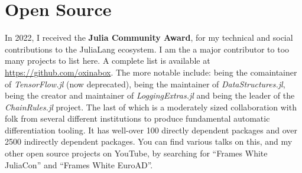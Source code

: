 \documentclass[11pt,a4paper,sans]{moderncv}
\begin{document}
\section{Open Source}
In 2022, I received the \textbf{Julia Community Award}, for my technical and social contributions to the JuliaLang ecosystem.
I am the a major contributor to too many projects to list here.
A complete list is available at \url{https://github.com/oxinabox}.
The more notable include: being the comaintainer of \emph{TensorFlow.jl} (now deprecated),
being the maintainer of \emph{DataStructures.jl}, being the creator and maintainer of \emph{LoggingExtras.jl} 
and being the leader of the \emph{ChainRules.jl} project.
The last of which is a moderately sized collaboration with folk from several different institutions to produce fundamental automatic differentiation tooling.
It has well-over 100 directly dependent packages and over 2500 indirectly dependent packages.
You can find various talks on this, and my other open source projects on YouTube, by searching for ``Frames White JuliaCon'' and ``Frames White EuroAD''.



\clearpage
\sethintscolumntowidth{[1234]}
\small
\nocite{*}

 
\end{document}
